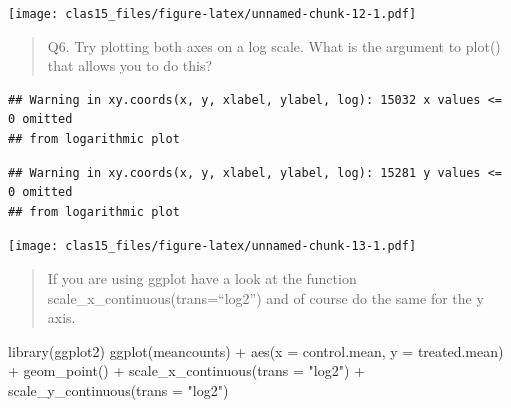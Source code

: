 \documentclass[
]{article}
\newenvironment{Shaded}{\begin{snugshade}}{\end{snugshade}}
\newcommand{\AttributeTok}[1]{\textcolor[rgb]{0.77,0.63,0.00}{#1}}
\newcommand{\FunctionTok}[1]{\textcolor[rgb]{0.00,0.00,0.00}{#1}}
\newcommand{\NormalTok}[1]{#1}
\newcommand{\SpecialCharTok}[1]{\textcolor[rgb]{0.00,0.00,0.00}{#1}}
\newcommand{\StringTok}[1]{\textcolor[rgb]{0.31,0.60,0.02}{#1}}
\begin{document}
\texttt{[image: clas15\_files/figure-latex/unnamed-chunk-12-1.pdf]}

\begin{quote}
Q6. Try plotting both axes on a log scale. What is the argument to
plot() that allows you to do this?
\end{quote}

\begin{Shaded}
\end{Shaded}

\begin{verbatim}
## Warning in xy.coords(x, y, xlabel, ylabel, log): 15032 x values <= 0 omitted
## from logarithmic plot
\end{verbatim}

\begin{verbatim}
## Warning in xy.coords(x, y, xlabel, ylabel, log): 15281 y values <= 0 omitted
## from logarithmic plot
\end{verbatim}

\texttt{[image: clas15\_files/figure-latex/unnamed-chunk-13-1.pdf]}

\begin{quote}
If you are using ggplot have a look at the function
scale\_x\_continuous(trans=``log2'') and of course do the same for the y
axis.
\end{quote}

\begin{Shaded}
\begin{Highlighting}[]
\FunctionTok{library}\NormalTok{(ggplot2)}
\FunctionTok{ggplot}\NormalTok{(meancounts) }\SpecialCharTok{+} \FunctionTok{aes}\NormalTok{(}\AttributeTok{x =}\NormalTok{ control.mean, }\AttributeTok{y =}\NormalTok{ treated.mean) }\SpecialCharTok{+} 
  \FunctionTok{geom\_point}\NormalTok{() }\SpecialCharTok{+} \FunctionTok{scale\_x\_continuous}\NormalTok{(}\AttributeTok{trans =} \StringTok{"log2"}\NormalTok{) }\SpecialCharTok{+} 
  \FunctionTok{scale\_y\_continuous}\NormalTok{(}\AttributeTok{trans =} \StringTok{"log2"}\NormalTok{)}
\end{Highlighting}
\end{Shaded}
\end{document}
